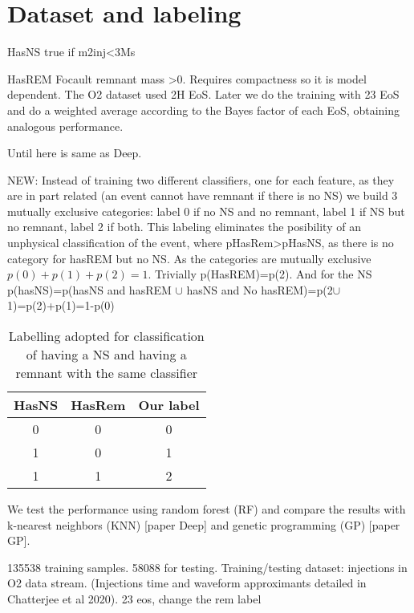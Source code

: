 \section{Dataset and labeling}
\label{sec:dataset}
HasNS true if m2inj<3Ms

HasREM Focault remnant mass >0. Requires compactness so it is model dependent. The O2 dataset used 2H EoS. Later we do the training with 23 EoS and do a weighted average according to the Bayes factor of each EoS, obtaining analogous performance.

Until here is same as Deep.

NEW: Instead of training two different classifiers, one for each feature, as they are in part related (an event cannot have remnant if there is no NS) we build 3 mutually exclusive categories: label 0 if no NS and no remnant, label 1 if NS but no remnant, label 2 if both. This labeling eliminates the posibility of an unphysical classification of the event, where pHasRem>pHasNS, as there is no category for hasREM but no NS. As the categories are mutually exclusive $p(0)+p(1)+p(2)=1$. Trivially p(HasREM)=p(2). And for the NS
p(hasNS)=p(hasNS and hasREM $\cup$ hasNS and No hasREM)=p(2$\cup$1)=p(2)+p(1)=1-p(0)


\begin{table}[h]
\centering
\begin{tabular}{@{}ccc@{}}
\toprule
HasNS & HasRem & Our label \\ \midrule
0     & 0      & 0         \\
1     & 0      & 1         \\
1     & 1      & 2         \\ \bottomrule
\end{tabular}
\caption{Labelling adopted for classification of having a NS and having a remnant with the same classifier}
\label{tab:labels}
\end{table}

We test the performance using random forest (RF) and compare the results with k-nearest neighbors (KNN) [paper Deep] and genetic programming (GP) [paper GP].

135538 training samples. 58088 for testing. Training/testing dataset: injections in O2 data stream. (Injections time and waveform approximants detailed in Chatterjee et al 2020).
23 eos, change the rem label
